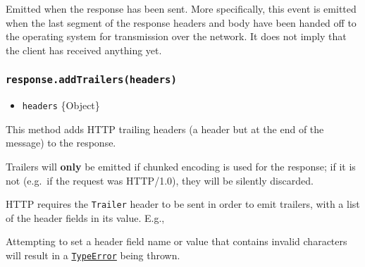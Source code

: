 Emitted when the response has been sent. More specifically, this event
is emitted when the last segment of the response headers and body have
been handed off to the operating system for transmission over the
network. It does not imply that the client has received anything yet.

\subsubsection{\texorpdfstring{\texttt{response.addTrailers(headers)}}{response.addTrailers(headers)}}\label{response.addtrailersheaders}

\begin{itemize}
\tightlist
\item
  \texttt{headers} \{Object\}
\end{itemize}

This method adds HTTP trailing headers (a header but at the end of the
message) to the response.

Trailers will \textbf{only} be emitted if chunked encoding is used for
the response; if it is not (e.g.~if the request was HTTP/1.0), they will
be silently discarded.

HTTP requires the \texttt{Trailer} header to be sent in order to emit
trailers, with a list of the header fields in its value. E.g.,

\begin{Shaded}
\begin{Highlighting}[]
\NormalTok{(}\OperatorTok{,}\NormalTok{ \{ }\OperatorTok{:} \OperatorTok{,}
                          \OperatorTok{:} \NormalTok{ \})}\OperatorTok{;}
\OperatorTok{;}
\NormalTok{(\{ }\OperatorTok{:} \NormalTok{ \})}\OperatorTok{;}
\NormalTok{()}\OperatorTok{;}
\end{Highlighting}
\end{Shaded}

Attempting to set a header field name or value that contains invalid
characters will result in a
\href{errors.md\#class-typeerror}{\texttt{TypeError}} being thrown.


